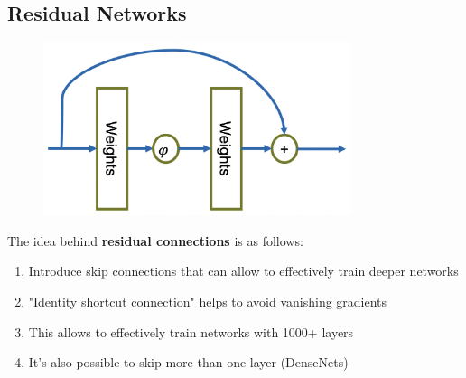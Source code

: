 \documentclass[a4paper]{extarticle}
\begin{document}
\subsection{Residual Networks}

\begin{figure}[H]
    \includegraphics[width=9cm]{../images/IntroML_Fig7-7}
    \centering
\end{figure}

The idea behind \textbf{residual connections} is as follows:
\begin{enumerate}
    \item Introduce skip connections that can allow to effectively train deeper networks
    \item "Identity shortcut connection" helps to avoid vanishing gradients
    \item This allows to effectively train networks with 1000+ layers
    \item It's also possible to skip more than one layer (DenseNets)
\end{enumerate}
\end{document}
